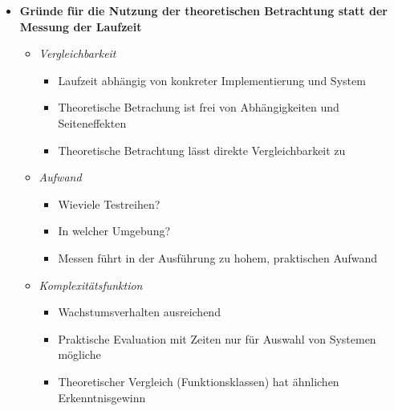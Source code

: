 \begin{itemize}
        \item \textbf{Gründe für die Nutzung der theoretischen Betrachtung statt der Messung der Laufzeit }
            \begin{itemize}
                \item \textit{Vergleichbarkeit}
                    \begin{itemize}
                        \item Laufzeit abhängig von konkreter Implementierung und System
                        \item Theoretische Betrachung ist frei von Abhängigkeiten und Seiteneffekten
                        \item Theoretische Betrachtung lässt direkte Vergleichbarkeit zu
                    \end{itemize}
                
                \item \textit{Aufwand}
                    \begin{itemize}
                        \item Wieviele Testreihen?
                        \item In welcher Umgebung?
                        \item Messen führt in der Ausführung zu hohem, praktischen Aufwand
                    \end{itemize}
                
                \item \textit{Komplexitätsfunktion}
                    \begin{itemize}
                        \item Wachstumsverhalten ausreichend
                        \item Praktische Evaluation mit Zeiten nur für Auswahl von Systemen mögliche
                        \item Theoretischer Vergleich (Funktionsklassen) hat ähnlichen Erkenntnisgewinn
                    \end{itemize}
            \end{itemize}
    \end{itemize}

